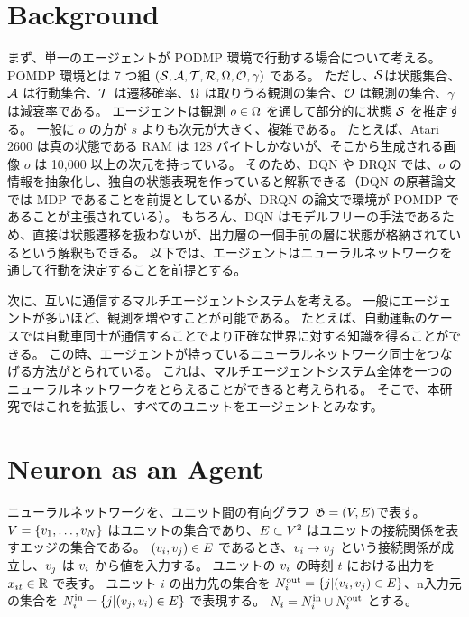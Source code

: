 \section{Background}
まず、単一のエージェントが PODMP 環境で行動する場合について考える。
POMDP 環境とは 7 つ組 $(\S, \A, \Trans, \R, \Observations, \ObProb, \gamma)$ である。
ただし、$\S$は状態集合、$\A$ は行動集合、$\Trans$ は遷移確率、$\Observations$ は取りうる観測の集合、$\ObProb$ は観測の集合、$\gamma$ は減衰率である。
エージェントは観測 $o \in \Observations$ を通して部分的に状態 $\S$ を推定する。
一般に $o$ の方が $s$ よりも次元が大きく、複雑である。
たとえば、Atari 2600 は真の状態である RAM は 128 バイトしかないが、そこから生成される画像 $o$ は 10,000 以上の次元を持っている。
そのため、DQN や DRQN では、$o$ の情報を抽象化し、独自の状態表現を作っていると解釈できる（DQN の原著論文では MDP であることを前提としているが、DRQN の論文で環境が POMDP であることが主張されている）。
もちろん、DQN はモデルフリーの手法であるため、直接は状態遷移を扱わないが、出力層の一個手前の層に状態が格納されているという解釈もできる\citep{zahavy2016graying}。
以下では、エージェントはニューラルネットワークを通して行動を決定することを前提とする。

次に、互いに通信するマルチエージェントシステムを考える。
一般にエージェントが多いほど、観測を増やすことが可能である。
たとえば、自動運転のケースでは自動車同士が通信することでより正確な世界に対する知識を得ることができる。
この時、エージェントが持っているニューラルネットワーク同士をつなげる方法がとられている\citep{sukhbaatar2016learning}。
これは、マルチエージェントシステム全体を一つのニューラルネットワークをとらえることができると考えられる。
そこで、本研究ではこれを拡張し、すべてのユニットをエージェントとみなす。



\section{Neuron as an Agent}
ニューラルネットワークを、ユニット間の有向グラフ $\neuralnet = (\units, \edges)$で表す。
$\units = \{\unitAt{1}, \dots, \unitAt{N}\}$ はユニットの集合であり、$\edges \subset \units^2$ はユニットの接続関係を表すエッジの集合である。
$(\unit, \unitAt{j}) \in \edges$ であるとき、$\unit \rightarrow \unitAt{j}$ という接続関係が成立し、$\unitAt{j}$ は $\unit$ から値を入力する。
ユニットの $\unit$ の時刻 $t$ における出力を $x_{it} \in \Real$ で表す。
ユニット $i$ の出力先の集合を $\followers = \{j | (\unit, \unitAt{j}) \in \edges \}$、n入力元の集合を $\followees = \{j | (\unitAt{j}, \unit) \in \edges \}$ で表現する。
$\friends = \followees \cup \followers$ とする。

